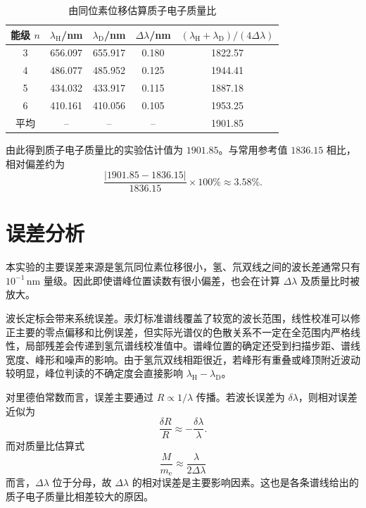 \documentclass[12pt,a4paper]{article}
\begin{document}
\begin{table}[htbp]
    \centering
    \caption{由同位素位移估算质子电子质量比}
    \label{tab:proton_electron}
    \begin{tabular}{ccccc}
        \toprule
        能级 $n$ & $\lambda_{\mathrm H}$/nm & $\lambda_{\mathrm D}$/nm & $\Delta\lambda$/nm & $(\lambda_{\mathrm H}+\lambda_{\mathrm D})/(4\Delta\lambda)$ \\
        \midrule
        3 & 656.097 & 655.917 & 0.180 & 1822.57 \\
        4 & 486.077 & 485.952 & 0.125 & 1944.41 \\
        5 & 434.032 & 433.917 & 0.115 & 1887.18 \\
        6 & 410.161 & 410.056 & 0.105 & 1953.25 \\
        \midrule
        平均 & -- & -- & -- & 1901.85 \\
        \bottomrule
    \end{tabular}
\end{table}

由此得到质子电子质量比的实验估计值为 $1901.85$。与常用参考值 $1836.15$ 相比，相对偏差约为
\begin{equation}
    \frac{|1901.85-1836.15|}{1836.15}\times100\%\approx3.58\%.
\end{equation}

\section{误差分析}
本实验的主要误差来源是氢氘同位素位移很小，氢、氘双线之间的波长差通常只有 $10^{-1}\,\mathrm{nm}$ 量级。因此即使谱峰位置读数有很小偏差，也会在计算 $\Delta\lambda$ 及质量比时被放大。

波长定标会带来系统误差。汞灯标准谱线覆盖了较宽的波长范围，线性校准可以修正主要的零点偏移和比例误差，但实际光谱仪的色散关系不一定在全范围内严格线性，局部残差会传递到氢氘谱线校准值中。谱峰位置的确定还受到扫描步距、谱线宽度、峰形和噪声的影响。由于氢氘双线相距很近，若峰形有重叠或峰顶附近波动较明显，峰位判读的不确定度会直接影响 $\lambda_{\mathrm H}-\lambda_{\mathrm D}$。

对里德伯常数而言，误差主要通过 $R\propto1/\lambda$ 传播。若波长误差为 $\delta\lambda$，则相对误差近似为
\begin{equation}
    \frac{\delta R}{R}\approx-\frac{\delta\lambda}{\lambda}.
\end{equation}
而对质量比估算式
\begin{equation}
    \frac{M}{m_{\mathrm e}}\approx\frac{\lambda}{2\Delta\lambda}
\end{equation}
而言，$\Delta\lambda$ 位于分母，故 $\Delta\lambda$ 的相对误差是主要影响因素。这也是各条谱线给出的质子电子质量比相差较大的原因。
\end{document}
